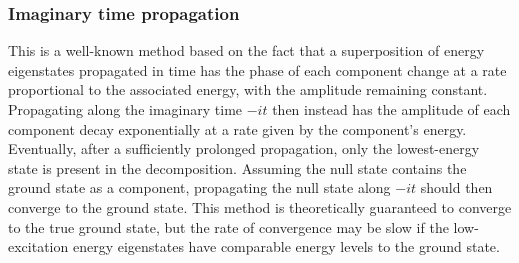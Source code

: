 \subsubsection{Imaginary time propagation}
This is a well-known method \cite{imaginary_timeprop} based on the fact that a superposition of energy eigenstates propagated in time has the phase of each component change at a rate proportional to the associated energy, with the amplitude remaining constant. Propagating along the imaginary time $-it$ then instead has the amplitude of each component decay exponentially at a rate given by the component's energy. Eventually, after a sufficiently prolonged propagation, only the lowest-energy state is present in the decomposition. Assuming the null state contains the ground state as a component, propagating the null state along $-it$ should then converge to the ground state. This method is theoretically guaranteed to converge to the true ground state, but the rate of convergence may be slow if the low-excitation energy eigenstates have comparable energy levels to the ground state.